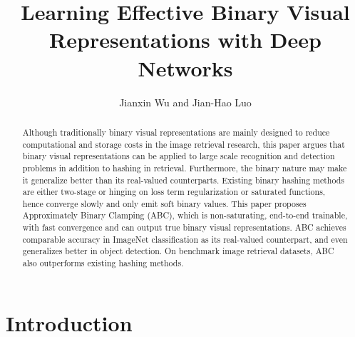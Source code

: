 \documentclass[runningheads]{llncs}
\begin{document}
\pagestyle{headings}
\mainmatter
\def\ECCV18SubNumber{***}  %

\title{Learning Effective Binary Visual Representations with Deep Networks}



\author{Jianxin Wu and Jian-Hao Luo}


\maketitle

\begin{abstract}
Although traditionally binary visual representations are mainly designed to reduce computational and storage costs in the image retrieval research, this paper argues that binary visual representations can be applied to large scale recognition and detection problems in addition to hashing in retrieval. Furthermore, the binary nature may make it generalize better than its real-valued counterparts. Existing binary hashing methods are either two-stage or hinging on loss term regularization or saturated functions, hence converge slowly and only emit soft binary values. This paper proposes Approximately Binary Clamping (ABC), which is non-saturating, end-to-end trainable, with fast convergence and can output true binary visual representations. ABC achieves comparable accuracy in ImageNet classification as its real-valued counterpart, and even generalizes better in object detection. On benchmark image retrieval datasets, ABC also outperforms existing hashing methods.
\end{abstract}


\section{Introduction}
\end{document}
